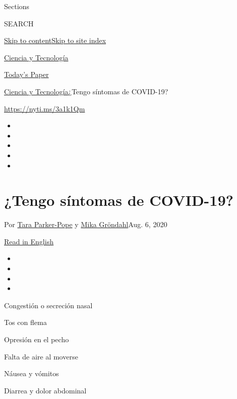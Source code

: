 Sections

SEARCH

\protect\hyperlink{site-content}{Skip to
content}\protect\hyperlink{site-index}{Skip to site index}

\href{https://www.nytimes3xbfgragh.onion/es/section/ciencia-y-tecnologia}{Ciencia
y Tecnología}

\href{https://myaccount.nytimes3xbfgragh.onion/auth/login?response_type=cookie\&client_id=vi}{}

\href{https://www.nytimes3xbfgragh.onion/section/todayspaper}{Today's
Paper}

\href{/es/section/ciencia-y-tecnologia}{Ciencia y
Tecnología}\textbar{}¿Tengo síntomas de COVID-19?

\url{https://nyti.ms/3a1k1Qm}

\begin{itemize}
\item
\item
\item
\item
\item
\end{itemize}

\hypertarget{tengo-suxedntomas-de-covid-19}{%
\section{¿Tengo síntomas de
COVID-19?}\label{tengo-suxedntomas-de-covid-19}}

Por \href{https://www.nytimes3xbfgragh.onion/by/tara-parker-pope}{Tara
Parker-Pope} y
\href{https://www.nytimes3xbfgragh.onion/by/mika-grondahl}{Mika
Gröndahl}Aug. 6, 2020

\href{https://www.nytimes3xbfgragh.onion/interactive/2020/08/05/well/covid-19-symptoms.html}{Read
in English}

\begin{itemize}
\item
\item
\item
\item
\end{itemize}

Congestión o secreción nasal

Tos con flema

Opresión en el pecho

Falta de aire al moverse

Náusea y vómitos

Diarrea y dolor abdominal

